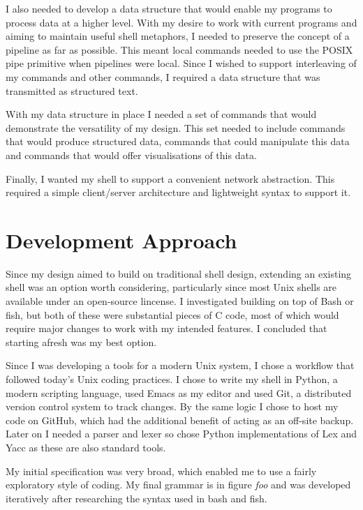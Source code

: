 \documentclass[12pt,twoside,notitlepage]{report}
\begin{document}
I also needed to develop a data structure that would enable my programs to
process data at a higher level. With my desire to work with current programs and
aiming to maintain useful shell metaphors, I needed to preserve the concept of a
pipeline as far as possible. This meant local commands needed to use the POSIX
pipe primitive when pipelines were local. Since I wished to support interleaving
of my commands and other commands, I required a data structure that was
transmitted as structured text.

With my data structure in place I needed a set of commands that would
demonstrate the versatility of my design. This set needed to include commands
that would produce structured data, commands that could manipulate this data and
commands that would offer visualisations of this data.

Finally, I wanted my shell to support a convenient network abstraction. This
required a simple client/server architecture and lightweight syntax to support it.

\section{Development Approach}
Since my design aimed to build on traditional shell design, extending an
existing shell was an option worth considering, particularly since most Unix
shells are available under an open-source lincense. I investigated building on
top of Bash or fish, but both of these were substantial pieces of C code, most
of which would require major changes to work with my intended features. I
concluded that starting afresh was my best option.

Since I was developing a tools for a modern Unix system, I chose a workflow that
followed today's Unix coding practices. I chose to write my shell in Python, a
modern scripting language, used Emacs as my editor and used Git, a distributed
version control system to track changes. By the same logic I chose to host my
code on GitHub, which had the additional benefit of acting as an off-site
backup. Later on I needed a parser and lexer so chose Python implementations of
Lex and Yacc as these are also standard tools.

My initial specification was very broad, which enabled me to use a fairly
exploratory style of coding. My final grammar is in figure {\em foo} and was
developed iteratively after researching the syntax used in bash and fish.
\end{document}
